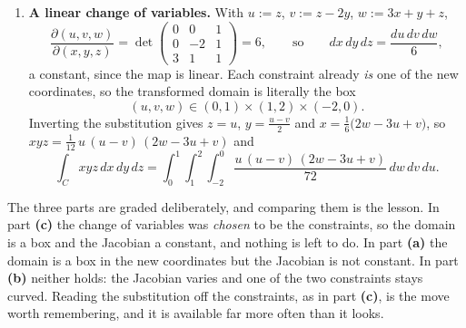 \begin{exercisesolution}
\begin{enumerate}[label=\textbf{(\alph*)}]
    Differentiating in the convenient direction,
    \[\frac{\partial(u,v)}{\partial(x,y)}
      = \det\begin{pmatrix} y & x \\ 2x & 0\end{pmatrix} = -2x^2 = -2v,
      \qquad\text{so}\qquad dx\,dy = \frac{du\,dv}{2v}.\]
    Now the constraints. $1 < xy < 2$ becomes $1 < u < 2$ at once. The second is the interesting
    one: $x^2 < y < 2x^2$ reads $v < u/\sqrt v < 2v$, i.e.
    \[v^{3/2} < u < 2\,v^{3/2}, \qquad\text{equivalently}\qquad
      \Big(\frac{u}{2}\Big)^{2/3} < v < u^{2/3}.\]
    The integrand becomes $y^2e^{-xy} = (u^2/v)\,e^{-u}$, so
    \[\int_B y^2e^{-xy}\,dx\,dy
      = \int_{1}^{2}\!\!\int_{(u/2)^{2/3}}^{u^{2/3}} \frac{u^2e^{-u}}{2v^2}\,dv\,du.\]
    Note what did \emph{not} happen: straightening $1 < xy < 2$ into a pair of constant bounds
    did nothing for the other constraint, which stays curved. Straightening one constraint does
    not oblige the rest to cooperate.
  \item \textbf{A linear change of variables.} With $u := z$, $v := z-2y$, $w := 3x+y+z$,
    \[\frac{\partial(u,v,w)}{\partial(x,y,z)}
      = \det\begin{pmatrix} 0 & 0 & 1 \\ 0 & -2 & 1 \\ 3 & 1 & 1\end{pmatrix} = 6,
      \qquad\text{so}\qquad dx\,dy\,dz = \frac{du\,dv\,dw}{6},\]
    a constant, since the map is linear. Each constraint already \emph{is} one of the new
    coordinates, so the transformed domain is literally the box
    \[(u,v,w) \in (0,1)\times(1,2)\times(-2,0).\]
    Inverting the substitution gives $z = u$, $y = \tfrac{u-v}{2}$ and
    $x = \tfrac{1}{6}\big(2w - 3u + v\big)$, so $xyz = \tfrac{1}{12}\,u\,(u-v)\,(2w-3u+v)$ and
    \[\int_C xyz\,dx\,dy\,dz
      = \int_{0}^{1}\!\!\int_{1}^{2}\!\!\int_{-2}^{0}
        \frac{u\,(u-v)\,(2w-3u+v)}{72}\,dw\,dv\,du.\]
\end{enumerate}

\begin{ainote}
The three parts are graded deliberately, and comparing them is the lesson. In part \textbf{(c)}
the change of variables was \emph{chosen} to be the constraints, so the domain is a box and the
Jacobian a constant, and nothing is left to do. In part \textbf{(a)} the domain is a box in the
new coordinates but the Jacobian is not constant. In part \textbf{(b)} neither holds: the Jacobian
varies and one of the two constraints stays curved. Reading the substitution off the constraints,
as in part \textbf{(c)}, is the move
worth remembering, and it is available far more often than it looks.
\end{ainote}
\end{exercisesolution}

